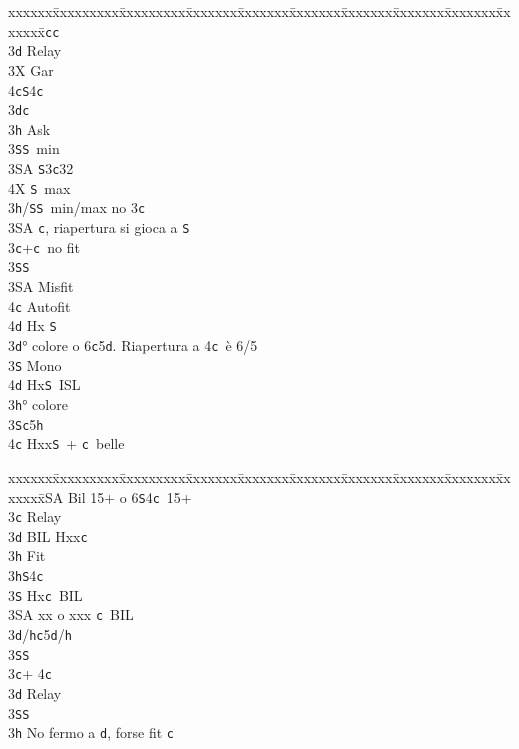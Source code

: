 \documentclass[a4paper,italian]{article}
\newcommand{\BS}{\small{\texttt{S}}}
\newcommand{\BC}{\small{\texttt{c}}}
\newcommand{\BD}{\small{\texttt{d}}}
\newcommand{\BH}{\small{\texttt{h}}}
\newenvironment{bidtable}
{\begin{tabbing}

    xxxxxx\=xxxxxxxxx\=xxxxxxxxx\=xxxxxxx\=xxxxxxx\=xxxxxxx\=xxxxxxx\=xxxxxxx\=xxxxxxx\=xxxxxxx\=\kill}
{\end{tabbing} }%
\begin{document}
\begin{multicols}{2}
\begin{bidtable}
        3\BC {}\BC \+\\
        3\BD \> Relay\+\\
        3X \> Gar\\
        4\BC {}\BS 4\BC \-\-\\
        3\BD {}\BC \+\\
        3\BH \> Ask\+\\
        3\BS {}\BS\ min\\
        3\small{SA} \BS 3\BC 32\\
        4X \BS\ max\-\-\\
        3\BH/\BS {}\BS\ min/max no 3\BC \\
        3\small{SA} \BC , riapertura si gioca a \BS \-\\
        3\BC {}+\BC\ no fit\+\\
        3\BS {}\BS \+\\
        3\small{SA} \> Misfit\\
        4\BC \> Autofit\\
        4\BD \> Hx \BS \-\-\\
        3\BD {}° colore o 6\BC 5\BD . Riapertura a 4\BC\ è 6/5\+\\
        3\BS \> Mono\+\\
        4\BD \> Hx\BS\ ISL\-\-\\
        3\BH {}° colore \\
        3\BS {}\BC 5\BH \\
        4\BC \> Hxx\BS\ + \BC\ belle\-\\
    \end{bidtable}
    \begin{bidtable}
        2\small{SA} \> Bil 15+ o 6\BS 4\BC\ 15+\+\\
        3\BC \> Relay\+\\
        3\BD \> BIL Hxx\BC \+\\
        3\BH \> Fit\-\\
        3\BH {}\BS 4\BC \\
        3\BS \> Hx\BC\ BIL\\
        3\small{SA} \> xx o xxx \BC\ BIL\-\\
        3\BD/\BH {}\BC 5\BD /\BH \\
        3\BS {}\BS \-\\
        3\BC {}+ 4\BC \+\\
        3\BD \> Relay\\
        3\BS {}\BS \\
        3\BH \> No fermo a \BD , forse fit \BC \-\\

\end{bidtable}
\end{multicols}
\end{document}
